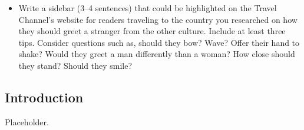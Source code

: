 \documentclass[stu,12pt]{apa7}
\begin{document}
\begin{enumerate}
\begin{itemize}
            \item Write a sidebar (3--4 sentences) that could be highlighted
              on the Travel Channel's website for readers traveling to the
              country you researched on how they should greet a stranger from
              the other culture. Include at least three tips. Consider
              questions such as, should they bow? Wave? Offer their hand to
              shake? Would they greet a man differently than a woman? How
              close should they stand? Should they smile?
          \end{itemize}
      \end{enumerate}


    \newpage
    \subsection{Introduction}
      Placeholder.





  \newpage
  \nocite{*}
  \printbibliography[%
    title={Additional References},%
    heading={bibintoc},%
    category={consulted}%
  ]
\end{document}
